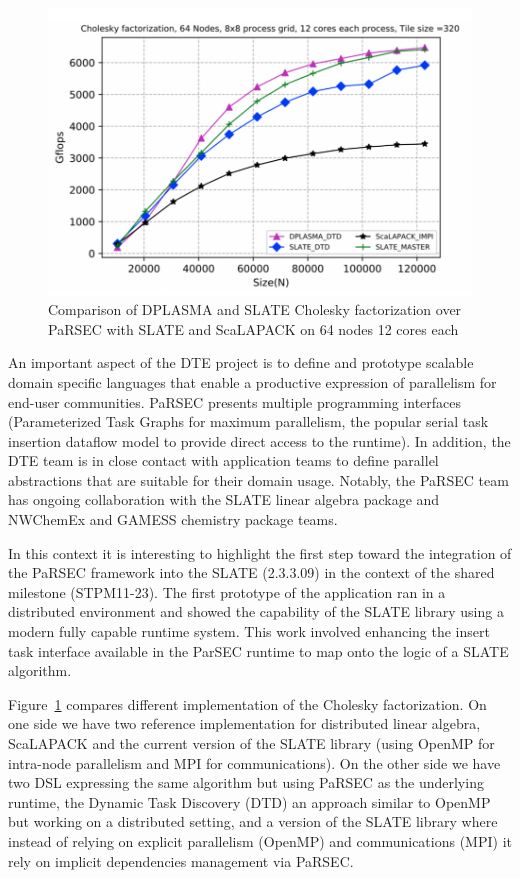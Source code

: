 \begin{figure}
\vspace*{-1em}\centering\includegraphics[scale=0.50]{projects/2.3.1-PMR/2.3.1.09-ParSEC/slate_updated_nacl.pdf}
  \caption{Comparison of DPLASMA and SLATE Cholesky factorization over PaRSEC with
           SLATE and ScaLAPACK on 64 nodes 12 cores each\label{fig:slate-parsec}}
\end{figure}
An important aspect of the DTE project is to define and prototype scalable
domain specific languages that enable a productive expression of parallelism for
end-user communities. PaRSEC presents multiple programming interfaces
(Parameterized Task Graphs for maximum parallelism, the popular serial task
insertion dataflow model to provide direct access to the runtime). In addition,
the DTE team is in close contact with application teams to define parallel
abstractions that are suitable for their domain usage. Notably, the PaRSEC team
has ongoing collaboration with the SLATE linear algebra package and NWChemEx and
GAMESS chemistry package teams.

In this context it is interesting to highlight the first step toward
the integration of the PaRSEC framework into the SLATE (2.3.3.09) in
the context of the shared milestone (STPM11-23). The first prototype
of the application ran in a distributed environment and showed the
capability of the SLATE library using a modern fully capable runtime
system. This work involved enhancing the insert task interface
available in the ParSEC runtime to map onto the logic of a SLATE
algorithm.

Figure~\ref{fig:slate-parsec} compares different implementation of the
Cholesky factorization. On one side we have two reference
implementation for distributed linear algebra, ScaLAPACK and the
current version of the SLATE library (using OpenMP for intra-node
parallelism and MPI for communications). On the other side we have two
DSL expressing the same algorithm but using PaRSEC as the underlying
runtime, the Dynamic Task Discovery (DTD) an approach similar to
OpenMP but working on a distributed setting, and a version of the
SLATE library where instead of relying on explicit parallelism
(OpenMP) and communications (MPI) it rely on implicit dependencies
management via PaRSEC.


